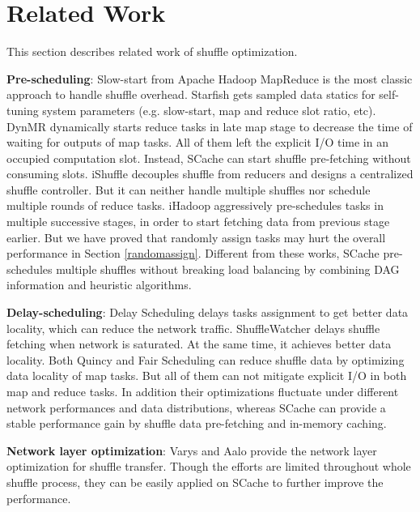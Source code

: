 \section{Related Work}
This section describes related work of shuffle optimization.

\textbf{Pre-scheduling}: Slow-start from Apache Hadoop MapReduce \cite{hadoop} is the most classic approach to handle shuffle overhead. Starfish \cite{starfish} gets sampled data statics for self-tuning system parameters (e.g. slow-start, map and reduce slot ratio, etc). DynMR \cite{dynmr} dynamically starts reduce tasks in late map stage to decrease the time of waiting for outputs of map tasks. All of them left the explicit I/O time in an occupied computation slot. Instead, SCache can start shuffle pre-fetching without consuming slots. iShuffle \cite{ishuffle} decouples shuffle from reducers and designs a centralized shuffle controller. But it can neither handle multiple shuffles nor schedule multiple rounds of reduce tasks. iHadoop \cite{ihadoop} aggressively pre-schedules tasks in multiple successive stages, in order to start fetching data from previous stage earlier. But we have proved that randomly assign tasks may hurt the overall performance in Section \ref{randomassign}. Different from these works, SCache pre-schedules multiple shuffles without breaking load balancing by combining DAG information and heuristic algorithms.

\textbf{Delay-scheduling}: Delay Scheduling \cite{delay} delays tasks assignment to get better data locality, which can reduce the network traffic. ShuffleWatcher \cite{shufflewatcher} delays shuffle fetching when network is saturated. At the same time, it achieves better data locality. Both Quincy \cite{quincy} and Fair Scheduling \cite{preemptive} can reduce shuffle data by optimizing data locality of map tasks. But all of them can not mitigate explicit I/O in both map and reduce tasks. In addition their optimizations fluctuate under different network performances and data distributions, whereas SCache can provide a stable performance gain by shuffle data pre-fetching and in-memory caching.

\textbf{Network layer optimization}: Varys \cite{varys} and Aalo \cite{aalo} provide the network layer optimization for shuffle transfer. Though the efforts are limited throughout whole shuffle process, they can be easily applied on SCache to further improve the performance.